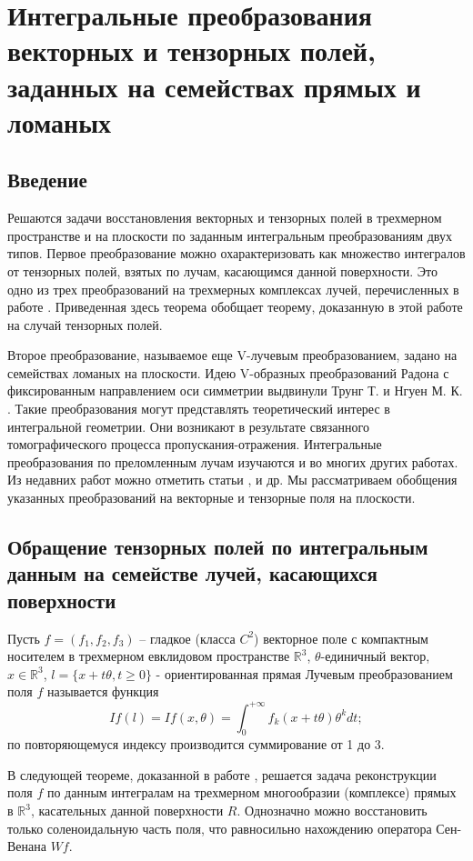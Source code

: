 \chapter{Интегральные преобразования векторных и тензорных полей, заданных на семействах прямых и ломаных}

\section{Введение}
Решаются задачи восстановления векторных и тензорных полей в трехмерном пространстве и на плоскости по заданным интегральным преобразованиям двух типов. Первое преобразование можно охарактеризовать как множество интегралов от тензорных полей, взятых по лучам, касающимся данной поверхности. Это одно из трех преобразований на трехмерных комплексах лучей, перечисленных в работе \cite{Medzhidov}. Приведенная здесь теорема обобщает теорему, доказанную в этой работе на случай тензорных полей.

Второе преобразование, называемое еще V-лучевым преобразованием, задано на семействах ломаных на плоскости. Идею V-образных преобразований Радона с фиксированным направлением оси симметрии выдвинули Трунг Т. и Нгуен М. К. \cite{Truong}. Такие преобразования могут представлять теоретический интерес в интегральной геометрии. Они возникают в результате связанного томографического процесса пропускания-отражения. Интегральные преобразования по преломленным лучам изучаются и во многих других работах. Из недавних работ можно отметить статьи \cite{Sharafutdinov}, \cite{Ambartsoumian}  и др.
Мы рассматриваем обобщения указанных преобразований на векторные и тензорные поля на плоскости.

\section{Обращение тензорных полей по интегральным данным на семействе лучей, касающихся поверхности}

Пусть $f=\left(f_1, f_2, f_3\right)$ -- гладкое (класса $C^2$) векторное поле с компактным носителем в трехмерном евклидовом пространстве $\mathbb R^3$, $\theta$-единичный вектор, $x\in \mathbb R^3$,  $l=\{x+t\theta, t\geq 0\}$ - ориентированная прямая Лучевым преобразованием поля $f$ называется функция
$$If(l)=If(x,\theta)=\int_0^{+\infty}f_k(x+t\theta)\theta^kdt;$$
по повторяющемуся индексу производится суммирование от 1 до 3.

В следующей теореме, доказанной в работе \cite{Medzhidov}, решается задача реконструкции поля  $f$ по данным интегралам   на трехмерном многообразии (комплексе) прямых в  $\mathbb R^3$, касательных данной поверхности $R$. Однозначно можно восстановить только соленоидальную часть поля, что  равносильно нахождению оператора Сен-Венана $Wf$.


